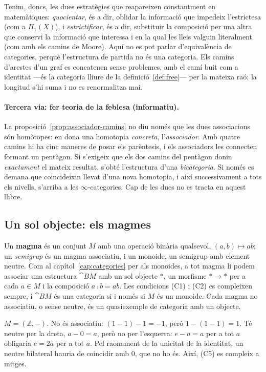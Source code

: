 Tenim, doncs, les dues estratègies que reapareixen constantment en matemàtiques: \emph{quocientar}, és a dir, oblidar la informació que impedeix l'estrictesa (com a $\Pi_1(X)$), i \emph{estrictificar}, és a dir, substituir la composició per una altra que conservi la informació que interessa i en la qual les lleis valguin literalment (com amb els camins de Moore). Aquí no es pot parlar d'equivalència de categories, perquè l'estructura de partida no és una categoria. Els camins d'arestes d'un graf es concatenen sense problemes, amb el camí buit com a identitat ---és la categoria lliure de la definició~\ref{def:free}--- per la mateixa raó: la longitud s'hi suma i no es renormalitza mai.

\paragraph{Tercera via: fer teoria de la feblesa (informatiu).} La proposició~\ref{prop:associador-camins} no diu només que les dues associacions són homòtopes: en dona una homotopia \emph{concreta}, l'\emph{associador}. Amb quatre camins hi ha cinc maneres de posar els parèntesis, i els associadors les connecten formant un pentàgon. Si s'exigeix que els dos camins del pentàgon donin \emph{exactament} el mateix resultat, s'obté l'estructura d'una \emph{bicategoria}. Si només es demana que coincideixin llevat d'una nova homotopia, i així successivament a tots els nivells, s'arriba a les $\infty$-categories. Cap de les dues no es tracta en aquest llibre.

\subsection{Un sol objecte: els magmes}

Un \textbf{magma} és un conjunt $M$ amb una operació binària qualsevol, $(a,b)\mapsto ab$; un \emph{semigrup} és un magma associatiu, i un monoide, un semigrup amb element neutre. Com al capítol~\ref{cap:categories} per als monoides, a tot magma li podem associar una estructura $\cat{B}M$ amb un sol objecte $\ast$, un morfisme $\ast\to\ast$ per a cada $a\in M$ i la composició $a\comp b=ab$. Les condicions (C1) i (C2) es compleixen sempre, i $\cat{B}M$ és una categoria si i només si $M$ és un monoide. Cada magma no associatiu, o sense neutre, és un quasiexemple de categoria amb un objecte.

\begin{exemple}
$M=(\mathbb Z,-)$. No és associatiu: $(1-1)-1=-1$, però $1-(1-1)=1$. Té neutre per la dreta, $a-0=a$, però no per l'esquerra: $e-a=a$ per a tot $a$ obligaria $e=2a$ per a tot $a$. Pel raonament de la unicitat de la identitat, un neutre bilateral hauria de coincidir amb $0$, que no ho és. Així, (C5) es compleix a mitges.
\end{exemple}

